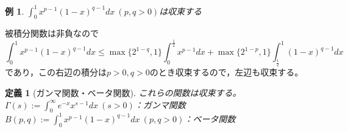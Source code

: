 \documentclass[dvipdfmx,a4j,10pt]{jsarticle}
\makeatletter
\theoremstyle{mystyle1}
\newtheorem{example}[dfn]{例}
\theoremstyle{mystyle2}
\newtheorem{dfn*}{定義}
\renewenvironment{proof}[1][\proofname]{\par
  \pushQED{\qed}%
  \normalfont
  \topsep6\p@\@plus6\p@ \trivlist
  \item[\hskip\labelsep{\bfseries\sffamily #1}]\ignorespaces
}{%
  \popQED\endtrivlist\@endpefalse
}
\renewcommand\proofname{証明}
\makeatother
\begin{document}
\begin{shaded}
    \begin{example}\label{ex-beta}
        $\displaystyle\int_0^1 x^{p-1}(1-x)^{q-1}dx\ (p,q>0)$は収束する\footnotemark
    \end{example}
\end{shaded}
\begin{proof}[例\ref{ex-beta}の証明]
被積分関数は非負なので
\[
\int_0^1 x^{p-1}(1-x)^{q-1}dx\leq\max\{2^{1-q},1\}\int_0^{\frac{1}{2}}x^{p-1}dx+\max\{2^{1-p},1\}\int_{\frac{1}{2}}^1(1-x)^{q-1}dx
\]
であり，この右辺の積分は$p>0,q>0$のとき収束するので，左辺も収束する。

\begin{framed}
    \begin{dfn*}[ガンマ関数・ベータ関数]
        これらの関数は収束する。\\
        $\displaystyle\Gamma(s):=\int_0^\infty e^{-x} x^{s-1}dx\ (s>0)$：ガンマ関数\\
        $\displaystyle B(p,q):=\int_0^1 x^{p-1}(1-x)^{q-1}dx\ (p,q>0)$：ベータ関数
    \end{dfn*}
\end{framed}

\newpage


\end{proof}
\end{document}
